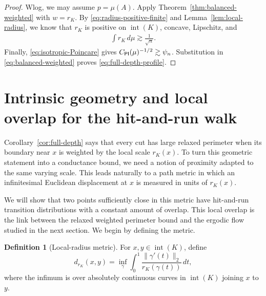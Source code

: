 \documentclass[11pt]{article}
\theoremstyle{definition}
\newtheorem{definition}[theorem]{Definition}
\theoremstyle{remark}
\newcommand{\rK}{r_K}
\begin{document}
\begin{proof}
Wlog, we may assume $p=\mu(A)$.  Apply Theorem~\ref{thm:balanced-weighted} with $w=\rK$.  By \eqref{eq:radius-positive-finite} and Lemma~\ref{lem:local-radius}, we know that $\rK$ is positive on ${\operatorname{int}(K)}$, concave, Lipschitz, and
\begin{align*}
    \int\rK\,d\mu\gtrsim \frac{1}{\sqrt{n}}.
\end{align*}
Finally,
\eqref{eq:isotropic-Poincare} gives
$C_{\sf PI}(\mu)^{-1/2}\gtrsim\psi_n$.  Substitution in
\eqref{eq:balanced-weighted} proves
\eqref{eq:full-depth-profile}.
\end{proof}

\section{Intrinsic geometry and local overlap for the hit-and-run walk}
\label{sec:intrinsic_metric}
Corollary~\ref{cor:full-depth} says that every cut has large relaxed perimeter when
its boundary near $x$ is weighted by the local scale $\rK(x)$.  To turn this
geometric statement into a conductance bound, we need a notion of proximity
adapted to the same varying scale.  This leads naturally to a path metric in
which an infinitesimal Euclidean displacement at $x$ is measured in units of
$\rK(x)$.

We will show that two points sufficiently close in this metric have
hit-and-run transition distributions with a constant amount of overlap.
This local overlap is the link between the relaxed weighted perimeter bound
and the ergodic flow studied in the next section.  We begin by defining
the metric.


\begin{definition}[Local-radius metric]\label{def:intrinsic-metric}
For $x,y\in\operatorname{int}(K)$, define
\begin{equation}\label{eq:drK}
 d_{\rK}(x,y)
 =
 \inf_{\gamma}
 \int_0^1
 \frac{\|\gamma'(t)\|_2}{\rK(\gamma(t))}\,dt,
\end{equation}
where the infimum is over absolutely continuous curves in
$\operatorname{int}(K)$ joining $x$ to $y$.
\end{definition}
\end{document}
